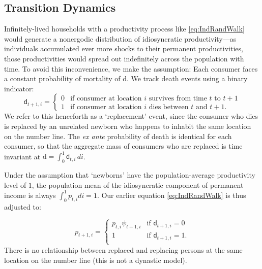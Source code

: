 \documentclass[titlepage]{article}
\begin{document}
\subsection{Transition Dynamics}

Infinitely-lived households with a productivity process like \eqref{eq:IndRandWalk} would generate a nonergodic distribution of idiosyncratic productivity---as individuals accumulated ever more shocks to their permanent productivities, those productivities would spread out indefinitely across the population with time. To avoid this inconvenience, we make the \cite{blanchardFinite} assumption: Each consumer faces a constant probability of mortality of $\mathrm{d}$. We track death events using a binary indicator:
\begin{equation*}
\mathsf{d}_{t+1,i} =
  \begin{cases}
    0 & \text{if consumer at location $i$ survives from time $t$ to $t+1$}
\\    1 & \text{if consumer at location $i$ dies between $t$ and $t+1$}.
  \end{cases}
\end{equation*}
We refer to this henceforth as a `replacement' event, since the consumer who dies is replaced by an unrelated newborn who happens to inhabit the same location on the number line.  The {\it ex ante} probability of death is identical for each consumer, so that the aggregate mass of consumers who are replaced is time invariant at $\mathrm{d} = \int_{0}^{1} \mathsf{d}_{t,i}\,di$.

Under the assumption that `newborns' have the population-average productivity level of $1$, the population mean of the idiosyncratic component of permanent income is always $\int_{0}^{1} {p}_{t,i}di = 1$. Our earlier equation \eqref{eq:IndRandWalk} is thus adjusted to:

\begin{equation*}  
{p}_{t+1,i} =
  \begin{cases}
       {p}_{t,i} \psi_{t+1,i} & \text{if } \mathsf{d}_{t+1,i} = 0 \\
    1 & \text{if } \mathsf{d}_{t+1,i} = 1. \\
  \end{cases}
\end{equation*}
 There is no relationship between replaced and replacing persons at the same location on the number line (this is not a dynastic model).
\end{document}
